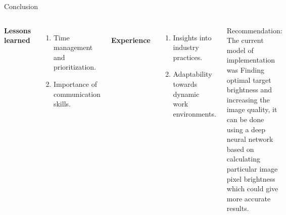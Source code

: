 \documentclass[aspectratio=169,xcolor=dvipsnames]{beamer}
\begin{document}
\begin{frame}{Conclusion}
    \tableofcontents

    \begin{columns}[c] %

        \textbf{Lessons learned}
        \begin{enumerate}
            \item Time management and prioritization.
            \item Importance of communication skills. 
        \end{enumerate}
        \break \\
    \textbf{Experience}
        \begin{enumerate}
            \item Insights into industry practices. 
            \item Adaptability towards dynamic work environments.
        \end{enumerate}
         Recommendation: The current model of implementation was Finding optimal target brightness and increasing the image quality, it can be done using a deep neural network based on calculating particular image pixel brightness which could give more accurate results.

    \end{columns}   \\

\end{frame}
\end{document}
